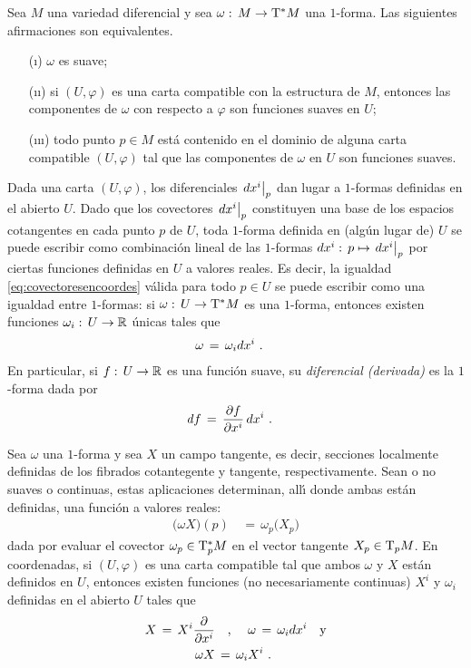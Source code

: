 \begin{propoUnoFormasSuaves}\label{thm:unoformassuavescomponentes}
	Sea $M$ una variedad diferencial y sea $\omega:\,%
	M\rightarrow\tangente*{M}$ una $1$-forma. Las siguientes afirmaciones
	son equivalentes.
	\begin{itemize}
		\item[(\i)] $\omega$ es suave;
		\item[(\i\i)] si $(U,\varphi)$ es una carta compatible
			con la estructura de $M$, entonces las componentes
			de $\omega$ con respecto a $\varphi$ son funciones
			suaves en $U$;
		\item[(\i\i\i)] todo punto $p\in M$ est\'{a} contenido en
			el dominio de alguna carta compatible
			$(U,\varphi)$ tal que las componentes de $\omega$
			en $U$ son funciones suaves.
	\end{itemize}
\end{propoUnoFormasSuaves}

Dada una carta $(U,\varphi)$, los diferenciales $\de[p]{x^{i}}$ dan
lugar a $1$-formas definidas en el abierto $U$. Dado que
los covectores $\de[p]{x^{i}}$ constituyen una base de los espacios
cotangentes en cada punto $p$ de $U$, toda $1$-forma definida en (alg\'{u}n
lugar de) $U$ se puede escribir como combinaci\'{o}n lineal de las
$1$-formas $\de{x^{i}}:\,p\mapsto\de[p]{x^{i}}$ por ciertas funciones
definidas en $U$ a valores reales. Es decir, la igualdad
\eqref{eq:covectoresencoordes} v\'{a}lida para todo $p\in U$ se puede
escribir como una igualdad entre $1$-formas: si
$\omega:\,U\rightarrow\tangente*{M}$ es una $1$-forma, entonces
existen funciones $\omega_{i}:\,U\rightarrow\mathbb{R}$ \'{u}nicas tales que
\begin{align*}
	\omega & \,=\,\omega_{i}\de{x^{i}}
	\text{ .}
\end{align*}
%
En particular, si $f:\,U\rightarrow\mathbb{R}$ es una funci\'{o}n suave,
su \emph{diferencial (derivada)} es la $1$-forma dada por
\begin{align*}
	\derext{f} & \,=\,\derivada{f}{x^{i}}\,\de{x^{i}}
	\text{ .}
\end{align*}
%

Sea $\omega$ una $1$-forma y sea $X$ un campo tangente, es decir, secciones
localmente definidas de los fibrados cotantegente y tangente, respectivamente.
Sean o no suaves o continuas, estas aplicaciones determinan, all\'{\i}
donde ambas est\'{a}n definidas, una funci\'{o}n a valores reales:
\begin{align*}
	\big(\omega X\big)(p) & \,=\,\omega_{p}\big(X_{p}\big)
\end{align*}
%
dada por evaluar el covector $\omega_{p}\in\tangente*[p]{M}$ en el vector
tangente $X_{p}\in\tangente[p]{M}$. En coordenadas, si $(U,\varphi)$ es una
carta compatible tal que ambos $\omega$ y $X$ est\'{a}n definidos en $U$,
entonces existen funciones (no necesariamente continuas) $X^{i}$ y
$\omega_{i}$ definidas en el abierto $U$ tales que
\begin{align*}
	X \,=\,X^{i}\gancho{x^{i}} & \quad\text{, }\quad
	\omega \,=\,\omega_{i}\de{x^{i}}\quad\text{y} \\
	\omega X & \,=\,\omega_{i}X^{i}
	\text{ .}
\end{align*}
%

